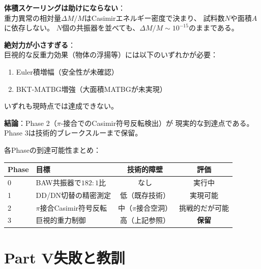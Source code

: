 \documentclass[11pt,a4paper]{article}
\begin{document}
\begin{tcolorbox}[colback=red!5!white, colframe=red!75!black, title=Phase 3の現実的評価]
\textbf{体積スケーリングは助けにならない}：\\
重力異常の相対量$\Delta M/M$はCasimirエネルギー密度で決まり、
試料数$N$や面積$A$に依存しない。
$N$個の共振器を並べても、$\Delta M/M \sim 10^{-15}$のままである。

\vspace{0.5em}
\textbf{絶対力が小さすぎる}：\\
巨視的な反重力効果（物体の浮揚等）には以下のいずれかが必要：
\begin{enumerate}
\item Euler積増幅（安全性が未確認）
\item BKT-MATBG増強（大面積MATBGが未実現）
\end{enumerate}
いずれも現時点では達成できない。

\vspace{0.5em}
\textbf{結論}：Phase 2（$\pi$-接合でのCasimir符号反転検出）が
現実的な到達点である。Phase 3は技術的ブレークスルーまで保留。
\end{tcolorbox}

\noindent
各Phaseの到達可能性まとめ：

\begin{center}
\begin{tabular}{llcc}
\toprule
\textbf{Phase} & \textbf{目標} & \textbf{技術的障壁} & \textbf{評価} \\
\midrule
0 & BAW共振器で$182:1$比 & なし & 実行中 \\
1 & DD/DN切替の精密測定 & 低（既存技術） & 実現可能 \\
2 & $\pi$接合Casimir符号反転 & 中（$\pi$接合空洞） & 挑戦的だが可能 \\
3 & 巨視的重力制御 & 高（上記参照） & \textbf{保留} \\
\bottomrule
\end{tabular}
\end{center}



\newpage
\part*{Part V\quad 失敗と教訓}
\end{document}
